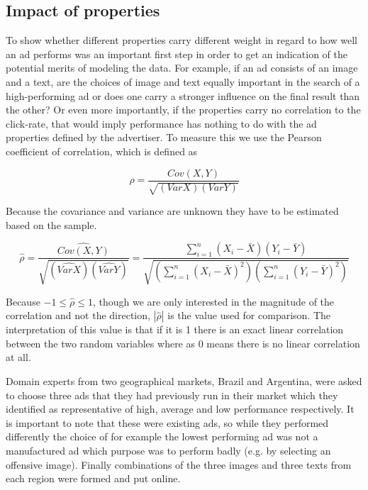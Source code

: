 \documentclass{sig-alternate}
\begin{document}
\subsection{Impact of properties}
To show whether different properties carry different weight in regard to how well an ad performs was an important first step in order to get an indication of the potential merits of modeling the data. For example, if an ad consists of an image and a text, are the choices of image and text equally important in the search of a high-performing ad or does one carry a stronger influence on the final result than the other? Or even more importantly, if the properties carry no correlation to the click-rate, that would imply performance has nothing to do with the ad properties defined by the advertiser. To measure this we use the Pearson coefficient of correlation, which is defined as

\begin{equation}
	\rho = \frac{Cov(X, Y)}{\sqrt{(Var X)(Var Y)}}
\end{equation}

Because the covariance and variance are unknown they have to be estimated based on the sample.

\begin{equation}
	\hat{\rho} = \frac{\widehat{Cov(X, Y)}}{\sqrt{(\widehat{Var X})(\widehat{Var Y})}} = \frac{ \sum_{i=1}^{n} (X_i - \bar{X})(Y_i - \bar{Y}) }{ \sqrt{ (\sum_{i=1}^{n} (X_i - \bar{X})^2) (\sum_{i=1}^{n} (Y_i - \bar{Y})^2) } }
\end{equation}

Because \(-1 \leq \hat{\rho} \leq 1 \), though we are only interested in the magnitude of the correlation and not the direction, \(|\hat{\rho}|\) is the value used for comparison. The interpretation of this value is that if it is 1 there is an exact linear correlation between the two random variables where as 0 means there is no linear correlation at all.

Domain experts from two geographical markets, Brazil and Argentina, were asked to choose three ads that they had previously run in their market which they identified as representative of high, average and low performance respectively. It is important to note that these were existing ads, so while they performed differently the choice of for example the lowest performing ad was not a manufactured ad which purpose was to perform badly (e.g. by selecting an offensive image). Finally combinations of the three images and three texts from each region were formed and put online.
\end{document}
